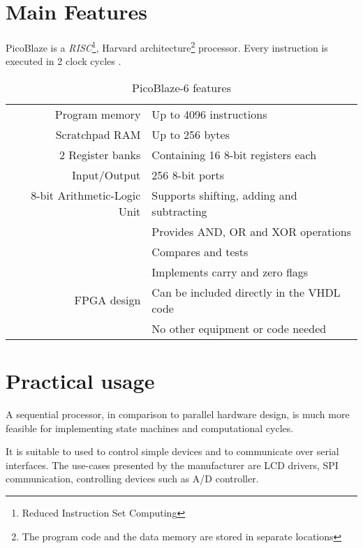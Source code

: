     \section{Main Features}\label{mainfeatures}

    PicoBlaze is a \emph{RISC}\footnote{Reduced Instruction Set Computing}, Harvard architecture\footnote{The program code and the data memory are stored in separate locations} processor. Every instruction is executed in 2 clock cycles \cite{PicoBlazeWeb} \cite{PicoBlaze6}.

    \begin{table}[H]
    \centering
    \begin{tabular}{ @{\extracolsep{\fill} } r | l }
        Program memory & Up to 4096 instructions \\

        Scratchpad RAM & Up to 256 bytes \\

        2 Register banks & Containing 16 8-bit registers each\\

        Input/Output & 256 8-bit ports \\

        8-bit Arithmetic-Logic Unit & Supports shifting, adding and subtracting \\
                                    & Provides AND, OR and XOR operations \\
                                    & Compares and tests \\
                                    & Implements carry and zero flags \\

        FPGA design & Can be included directly in the VHDL code \\
                    & No other equipment or code needed \\
    \end{tabular}
    \caption{PicoBlaze-6 features}
    \end{table}

    \section{Practical usage}

    A sequential processor, in comparison to parallel hardware design, is much more feasible for implementing state machines and computational cycles.

    It is suitable to used to control simple devices and to communicate over serial interfaces. The use-cases presented by the manufacturer are LCD drivers, SPI communication, controlling devices such as A/D controller.


